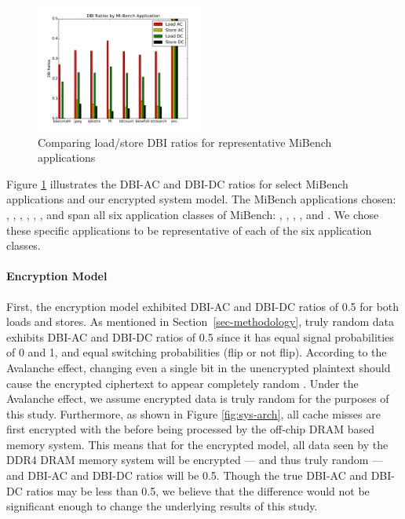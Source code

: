 \begin{figure}[!htb]
  \centering
  \includegraphics[width=0.5\textwidth]{figs/dbiGraph}
  \caption{Comparing load/store DBI ratios for representative MiBench applications}
  \label{fig:dbiGraph}
\end{figure}

Figure \ref{fig:dbiGraph} illustrates the DBI-AC and DBI-DC ratios for select
MiBench applications and our encrypted system model. The MiBench applications
chosen: , , , , ,
, and  span all six application classes of MiBench:
, , , ,  and
. We chose these specific applications to be representative of each
of the six application classes.

\paragraph{Encryption Model} First, the encryption model exhibited DBI-AC and
DBI-DC ratios of 0.5 for both loads and stores. As mentioned in
Section~\ref{sec-methodology}, truly random data exhibits DBI-AC and DBI-DC
ratios of 0.5 \cite{hollis} since it has equal signal probabilities of 0 and 1,
and equal switching probabilities (flip or not flip).  According to the
Avalanche effect, changing even a single bit in the unencrypted plaintext
should cause the encrypted ciphertext to appear completely random
\cite{avalance}. Under the Avalanche effect, we assume encrypted data is truly
random for the purposes of this study. Furthermore, as shown in Figure
\ref{fig:sys-arch}, all cache misses are first encrypted with the
 before being processed by the off-chip DRAM based memory
system. This means that for the encrypted model, all data seen by the DDR4 DRAM
memory system will be encrypted --- and thus truly random --- and DBI-AC and
DBI-DC ratios will be 0.5.  Though the true DBI-AC and DBI-DC ratios may be
less than 0.5, we believe that the difference would not be significant enough
to change the underlying results of this study.

